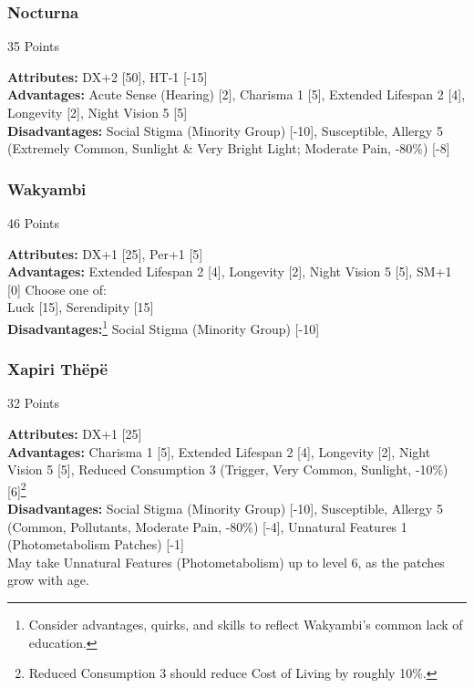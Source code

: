 \begin{multicols*}{3}
	\subsubsection*{Nocturna}
	\begin{flushright}
		35 Points
	\end{flushright}
	\textbf{Attributes:} 
	DX+2 [50], HT-1 [-15]
	\\\textbf{Advantages:} 
	Acute Sense (Hearing) [2], Charisma 1 [5], Extended Lifespan 2 [4], Longevity [2], Night Vision 5 [5]
	\\\textbf{Disadvantages:} 
	Social Stigma (Minority Group) [-10], Susceptible, Allergy 5 (Extremely Common, Sunlight \& Very Bright Light; Moderate Pain, -80\%) [-8]
	
	\subsubsection*{Wakyambi}
	\begin{flushright}
		46 Points
	\end{flushright}
	\textbf{Attributes:} 
	DX+1 [25], Per+1 [5]
	\\\textbf{Advantages:} 
	Extended Lifespan 2 [4], Longevity [2], Night Vision 5 [5], SM+1 [0]
	Choose one of: \\
	Luck [15], Serendipity [15]
	\\\textbf{Disadvantages:}\footnote{Consider advantages, quirks, and skills to reflect Wakyambi's common lack of education.}
	Social Stigma (Minority Group) [-10]
	
	\subsubsection*{Xapiri Thëpë}
	\begin{flushright}
		32 Points
	\end{flushright}
	\textbf{Attributes:} 
	DX+1 [25]
	\\\textbf{Advantages:} 
	Charisma 1 [5], Extended Lifespan 2 [4], Longevity [2], Night Vision 5 [5], Reduced Consumption 3 (Trigger, Very Common, Sunlight, -10\%)[6]\footnote{Reduced Consumption 3 should reduce Cost of Living by roughly 10\%.}
	\\\textbf{Disadvantages:} 
	Social Stigma (Minority Group) [-10], Susceptible, Allergy 5 (Common, Pollutants, Moderate Pain, -80\%) [-4], Unnatural Features 1 (Photometabolism Patches) [-1]
	\\ May take Unnatural Features (Photometabolism) up to level 6, as the patches grow with age.
	

\end{multicols*}
